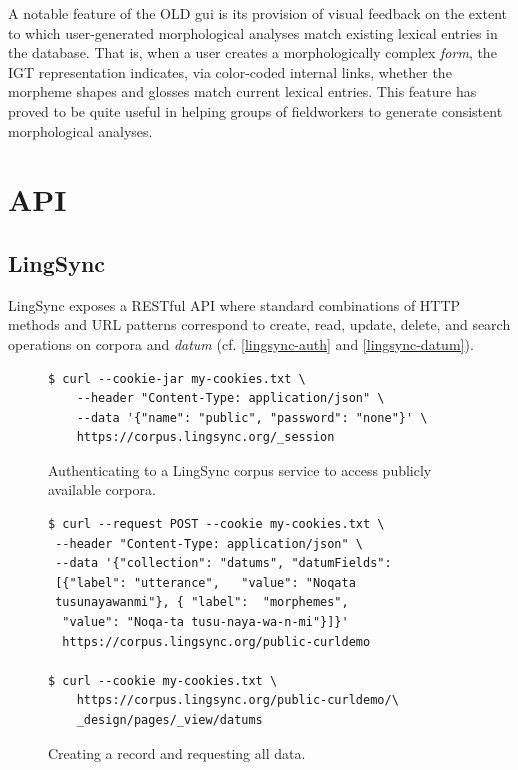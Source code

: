 \documentclass[11pt]{article}
\begin{document}
A notable feature of the OLD \gls{gui} is its provision of visual feedback on the
extent to which user-generated morphological analyses match existing lexical
entries in the database. That is, when a user creates a morphologically complex
\emph{form}, the IGT representation indicates, via color-coded internal links,
whether the morpheme shapes and glosses match current lexical entries. This
feature has proved to be quite useful in helping groups of fieldworkers to
generate consistent morphological analyses.



\section{API}
\subsection{LingSync}

LingSync exposes a RESTful API where standard combinations of HTTP methods and
URL patterns correspond to create, read, update, delete, and search operations
on corpora and \emph{datum} (cf. \autoref{lingsync-auth} and
\autoref{lingsync-datum}).


\begin{figure}[h]
\scriptsize
\begin{verbatim}
$ curl --cookie-jar my-cookies.txt \
    --header "Content-Type: application/json" \
    --data '{"name": "public", "password": "none"}' \
    https://corpus.lingsync.org/_session
\end{verbatim}
\normalsize
\caption{Authenticating to a LingSync corpus service to access publicly
available corpora.}
\label{lingsync-auth}
\end{figure}

\begin{figure}[h]
\scriptsize
\begin{verbatim}
$ curl --request POST --cookie my-cookies.txt \
 --header "Content-Type: application/json" \
 --data '{"collection": "datums", "datumFields": 
 [{"label": "utterance",   "value": "Noqata 
 tusunayawanmi"}, { "label":  "morphemes",
  "value": "Noqa-ta tusu-naya-wa-n-mi"}]}' 
  https://corpus.lingsync.org/public-curldemo 

$ curl --cookie my-cookies.txt \
	https://corpus.lingsync.org/public-curldemo/\
    _design/pages/_view/datums
\end{verbatim}
\normalsize
\caption{Creating a record and requesting all data.}
\label{lingsync-datum}
\end{figure}
\end{document}
